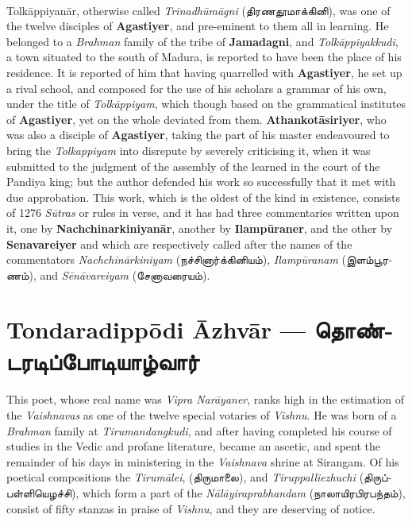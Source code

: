 \documentclass{article}
\newcommand{\TamilText}[1]{\texttamil{#1}}
\newcommand{\TamilBold}[1]{\texttamil{\textbf{#1}}}
\newcommand{\tam}[1]{\TamilText{#1}}
\newcommand{\tambold}[1]{\TamilBold{#1}}
\begin{document}
\paragraph{}
Tolk\={a}ppiyan\={a}r, otherwise called \emph{Trinadh\={u}m\={a}gni} (\tam{திரணதூமாக்கினி}), was one of the twelve disciples of \textbf{Agastiyer}, and pre-eminent to them all in learning. He belonged to a \emph{Brahman} family of the tribe of \textbf{Jamadagni}, and \emph{Tolk\={a}ppiyakkudi}, a town situated to the south of Madura, is reported to have been the place of his residence. It is reported of him that having quarrelled with \textbf{Agastiyer}, he set up a rival school, and composed for the use of his scholars a grammar of his own, under the title of \emph{Tolk\={a}ppiyam}, which though based on the grammatical institutes of \textbf{Agastiyer}, yet on the whole deviated from them. \textbf{Athankot\={a}siriyer}, who was also a disciple of \textbf{Agastiyer}, taking the part of his master endeavoured to bring the \emph{Tolkappiyam} into disrepute by severely criticising it, when it was submitted to the judgment of the assembly of the learned in the court of the Pandiya king; but the author defended his work so successfully that it met with due approbation. This work, which is the oldest of the kind in existence, consists of 1276 \emph{S\={u}tras} or rules in verse, and it has had three commentaries written upon it, one by \textbf{Nachchinarkiniyan\={a}r}, another by \textbf{Ilamp\={u}raner}, and the other by \textbf{Senavareiyer} and which are respectively called after the names of the commentators \emph{Nachchin\={a}rkiniyam} (\tam{நச்சினார்க்கினியம்}), \emph{Ilamp\={u}ranam} (\tam{இளம்பூரணம்}), and \emph{S\={e}n\={a}vareiyam} (\tam{சேனாவரையம்}).

\section{Tondaradipp\={o}di \={A}zhv\={a}r --- \tambold{தொண்டரடிப்போடியாழ்வார்}}
\paragraph{}
This poet, whose real name was \emph{Vipra Nar\={a}yaner}, ranks high in the estimation of the \emph{Vaishnavas} as one of the twelve special votaries of \emph{Vishnu}. He was born of a \emph{Brahman} family at \emph{Tirumandangkudi}, and after having completed his course of studies in the Vedic and profane literature, became an ascetic, and spent the remainder of his days in ministering in the \emph{Vaishnava} shrine at Sirangam. Of his poetical compositions the \emph{Tirum\={a}lei}, (\tam{திருமாலை}), and \emph{Tiruppalliezhuchi} (\tam{திருப்பள்ளியெழச்சி}), which form a part of the \emph{N\={a}l\={a}yiraprabhandam} (\tam{நாலாயிரபிரபந்தம்}), consist of fifty stanzas in praise of \emph{Vishnu}, and they are deserving of notice.
\end{document}
